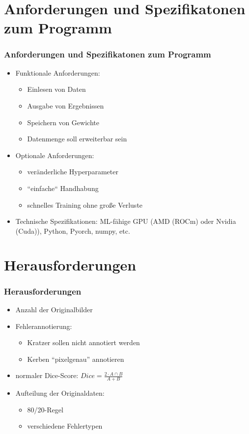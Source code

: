 \documentclass{beamer}
\begin{document}
\section{Anforderungen und Spezifikatonen zum Programm}
\begin{frame}
    \frametitle{Anforderungen und Spezifikatonen zum Programm}
    \begin{itemize}
        \item Funktionale Anforderungen:
            \begin{itemize}
                \item Einlesen von Daten
                \item Ausgabe von Ergebnissen
                \item Speichern von Gewichte
                \item Datenmenge soll erweiterbar sein
            \end{itemize}
        \item Optionale Anforderungen:
            \begin{itemize}
                \item veränderliche Hyperparameter
                \item ``einfache`` Handhabung
                \item schnelles Training ohne große Verluste
            \end{itemize}
        \item Technische Spezifikationen: 
        ML-fähige GPU (AMD (ROCm) oder Nvidia (Cuda)), 
        Python, Pyorch, numpy, etc.
    \end{itemize}
\end{frame}

\section{Herausforderungen}
\begin{frame}
\frametitle{Herausforderungen}
\begin{itemize}
    \item Anzahl der Originalbilder
    \item Fehlerannotierung:
    \begin{itemize}
        \item Kratzer sollen nicht annotiert werden
        \item Kerben ``pixelgenau'' annotieren
    \end{itemize}
    \item normaler Dice-Score:
    $Dice = \frac{2 \cdot A \cap B}{A + B}$ 
    \item Aufteilung der Originaldaten:
    \begin{itemize}
        \item 80/20-Regel
        \item verschiedene Fehlertypen
    \end{itemize}
\end{itemize}
\end{frame}
\end{document}
